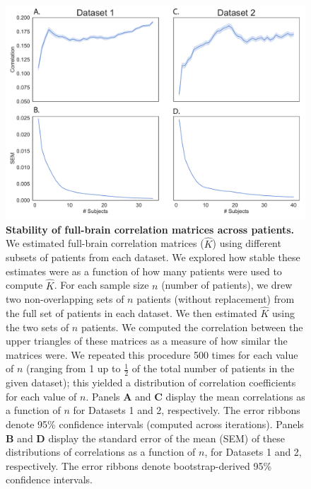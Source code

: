\documentclass[11pt]{article}
\begin{document}
\begin{figure}[p]
\centering \includegraphics[width=\textwidth]{figs/supplemental_8}
\caption{\textbf{Stability of full-brain correlation matrices across
    patients.}  We estimated full-brain correlation matrices
  ($\hat{K}$) using different subsets of patients from each
  dataset. We explored how stable these estimates were as a function
  of how many patients were used to compute $\hat{K}$. For each sample
  size $n$ (number of patients), we drew two non-overlapping sets of
  $n$ patients (without replacement) from the full set of patients in
  each dataset. We then estimated $\hat{K}$ using the two sets of $n$
  patients.  We computed the correlation between the upper triangles
  of these matrices as a measure of how similar the matrices were.  We
  repeated this procedure 500 times for each value of $n$ (ranging
  from 1 up to $\frac{1}{2}$ of the total number of patients in the
  given dataset); this yielded a distribution of correlation
  coefficients for each value of $n$.  Panels \textbf{A} and
  \textbf{C} display the mean correlations as a function of $n$ for
  Datasets 1 and 2, respectively.  The error ribbons denote 95\%
  confidence intervals (computed across iterations).  Panels
  \textbf{B} and \textbf{D} display the standard error of the mean
  (SEM) of these distributions of correlations as a function of $n$,
  for Datasets 1 and 2, respectively.  The error ribbons denote
  bootstrap-derived 95\% confidence intervals.}
\label{fig:supplemental_8}
\end{figure}

\clearpage
\newpage
\renewcommand{\refname}{Supplemental references}
\renewcommand{\bibnumfmt}[1]{[S#1]}
\renewcommand{\citenumfont}[1]{S#1}



% 
\end{document}

